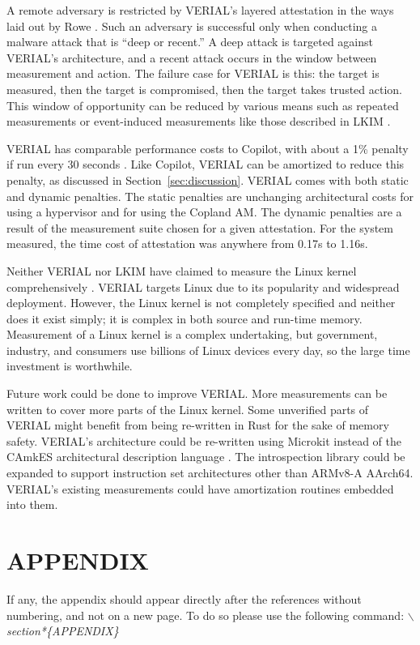 \documentclass[a4paper,twoside]{article}
\begin{document}
A remote adversary is restricted by VERIAL's layered attestation in the ways laid out by Rowe \cite{Confining}. Such an adversary is successful only when conducting a malware attack that is ``deep or recent.'' A deep attack is targeted against VERIAL's architecture, and a recent attack occurs in the window between measurement and action. The failure case for VERIAL is this: the target is measured, then the target is compromised, then the target takes trusted action. This window of opportunity can be reduced by various means such as repeated measurements or event-induced measurements like those described in LKIM \cite{LKIMPaid}.

VERIAL has comparable performance costs to Copilot, with about a 1\% penalty if run every 30 seconds \cite{Copilot}. Like Copilot, VERIAL can be amortized to reduce this penalty, as discussed in Section~\ref{sec:discussion}. VERIAL comes with both static and dynamic penalties. The static penalties are unchanging architectural costs for using a hypervisor and for using the Copland AM. The dynamic penalties are a result of the measurement suite chosen for a given attestation. For the system measured, the time cost of attestation was anywhere from 0.17s to 1.16s.

Neither VERIAL nor LKIM have claimed to measure the Linux kernel comprehensively \cite{LKIMPaid}. VERIAL targets Linux due to its popularity and widespread deployment. However, the Linux kernel is not completely specified and neither does it exist simply; it is complex in both source and run-time memory. Measurement of a Linux kernel is a complex undertaking, but government, industry, and consumers use billions of Linux devices every day, so the large time investment is worthwhile.

Future work could be done to improve VERIAL. More measurements can be written to cover more parts of the Linux kernel. Some unverified parts of VERIAL might benefit from being re-written in Rust for the sake of memory safety. VERIAL's architecture could be re-written using Microkit instead of the CAmkES architectural description language \cite{camkesref, microkitref}. The introspection library could be expanded to support instruction set architectures other than ARMv8-A AArch64. VERIAL's existing measurements could have amortization routines embedded into them.


{\small
}

\section*{\uppercase{Appendix}}

If any, the appendix should appear directly after the
references without numbering, and not on a new page. To do so please use the following command:
\textit{$\backslash$section*\{APPENDIX\}}
\end{document}
